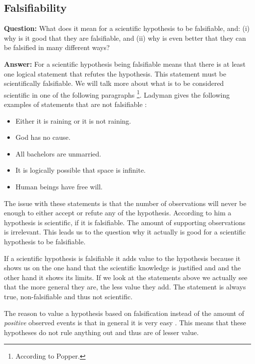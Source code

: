 \documentclass[11pt]{scrartcl}
\begin{document}
\subsection{Falsifiability}

\textbf{Question:} What does it mean for a scientific hypothesis to be falsifiable, and: (i) why is it good that they are falsifiable, and (ii) why is even better that they can be falsified in many different ways?

\bigbreak

\textbf{Answer:} For a scientific hypothesis being falsifiable means that there is at least one logical statement that refutes the hypothesis. This statement must be scientifically falsifiable. We will talk more about what is to be considered scientific in one of the following paragraphs \footnote{According to Popper.}. Ladyman gives the following examples of statements that are not falsifiable \cite[p. 69]{ladyman}:

\begin{itemize}
  \item Either it is raining or it is not raining.
  \item God has no cause.
  \item All bachelors are unmarried.
  \item It is logically possible that space is infinite.
  \item Human beings have free will.
\end{itemize}

The issue with these statements is that the number of observations will never be enough to either accept or refute any of the hypothesis. According to him a hypothesis is scientific, if it is falsifiable. The amount of supporting observations is irrelevant. This leads us to the question why it actually is good for a scientific hypothesis to be falsifiable.

If a scientific hypothesis is falsifiable it adds value to the hypothesis because it shows us on the one hand that the scientific knowledge is justified and and the other hand it shows its limits. If we look at the statements above we actually see that the more general they are, the less value they add. The statement  is always true, non-falsifiable and thus not scientific.

The reason to value a hypothesis based on falsification instead of the amount of \textit{positive} observed events is that in general it is very easy  \cite[p. 66]{ladyman}. This means that these hypotheses do not rule anything out and thus are of lesser value.
\end{document}

